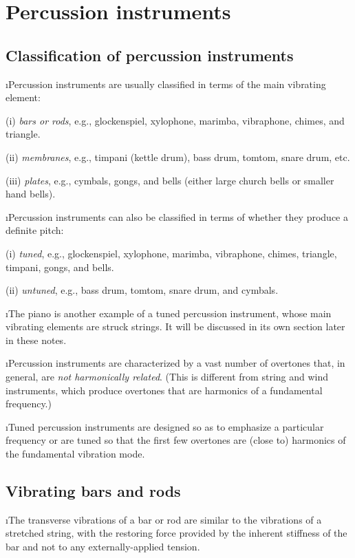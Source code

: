 \section{Percussion instruments}

\subsection{Classification of percussion instruments}
\bi

\i Percussion instruments are usually classified in 
terms of the main vibrating element:

(i) {\em bars or rods}, e.g.,
glockenspiel, xylophone, marimba, vibraphone,
chimes, and triangle.

(ii) {\em membranes}, e.g.,
timpani (kettle drum), bass drum, tomtom, snare
drum, etc.

(iii) {\em plates}, e.g.,
cymbals, gongs, and bells (either large church bells
or smaller hand bells).

\i Percussion instruments can also be classified 
in terms of whether they produce a definite pitch:

(i) {\em tuned}, e.g., 
glockenspiel, xylophone, marimba, vibraphone, 
chimes, triangle, timpani, gongs, and bells.

(ii) {\em untuned}, e.g., 
bass drum, tomtom, snare drum, and cymbals.

\i The piano is another example of a tuned percussion 
instrument, whose main vibrating elements are struck strings.
It will be discussed in its own section later in these notes.

\i Percussion instruments are characterized by a vast
number of overtones that, in general, are 
{\em not harmonically related}.
(This is different from string and wind instruments,
which produce overtones that are harmonics of a 
fundamental frequency.)

\i Tuned percussion instruments are designed so as to 
emphasize a particular frequency or are tuned
so that the first few overtones are (close to) harmonics
of the fundamental vibration mode.

\ei
\subsection{Vibrating bars and rods}
\bi

\i The transverse vibrations of a bar or rod
are similar to the vibrations of a stretched string, 
with the restoring force provided by the inherent 
stiffness of the bar and not to any externally-applied
tension.

